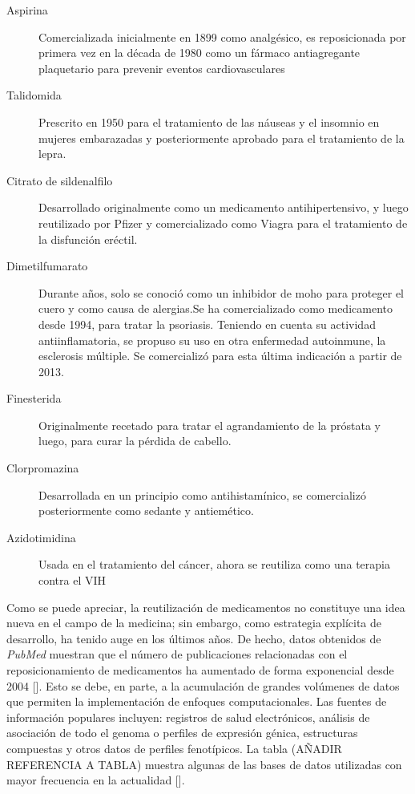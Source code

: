 \begin{description}
    \item[Aspirina] Comercializada inicialmente en 1899 como analgésico, es reposicionada por primera vez en la década de 1980 como un fármaco antiagregante plaquetario para prevenir eventos cardiovasculares
    \item[Talidomida] Prescrito en 1950 para el tratamiento de las náuseas y el insomnio en mujeres embarazadas y posteriormente aprobado para el tratamiento de la lepra.
    \item[Citrato de sildenalfilo] Desarrollado originalmente como un medicamento antihipertensivo, y luego reutilizado por Pfizer y comercializado como Viagra para el tratamiento de la disfunción eréctil.
    \item[Dimetilfumarato] Durante años, solo se conoció como un inhibidor de moho para proteger el cuero y como causa de alergias.Se ha comercializado como medicamento desde 1994, para tratar la psoriasis. Teniendo en cuenta su actividad antiinflamatoria, se propuso su uso en otra enfermedad autoinmune, la esclerosis múltiple. Se comercializó para esta última indicación a partir de 2013.
    \item[Finesterida] Originalmente recetado para tratar el agrandamiento de la próstata y luego, para curar la pérdida de cabello.
    \item[Clorpromazina] Desarrollada en un principio como antihistamínico, se comercializó posteriormente como sedante y antiemético.
    \item[Azidotimidina] Usada en el tratamiento del cáncer, ahora se reutiliza como una terapia contra el VIH
\end{description}

Como se puede apreciar, la reutilización de medicamentos no constituye una idea nueva en el campo de la medicina; sin embargo, como estrategia explícita de desarrollo, ha tenido auge en los últimos años. De hecho, datos obtenidos de \textit{PubMed} muestran que el número de publicaciones relacionadas con el reposicionamiento de medicamentos ha aumentado de forma exponencial desde 2004 [\cite{advances}]. Esto se debe, en parte, a la acumulación de grandes volúmenes de datos que permiten la implementación de enfoques computacionales. Las fuentes de información populares incluyen: registros de salud electrónicos, análisis de asociación de todo el genoma o perfiles de expresión génica, estructuras compuestas y otros datos de perfiles fenotípicos. La tabla (AÑADIR REFERENCIA A TABLA) muestra algunas de las bases de datos utilizadas con mayor frecuencia en la actualidad [\cite{databases}].

